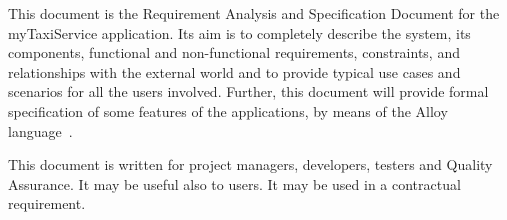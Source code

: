 This document is the  Requirement Analysis and Specification Document for the myTaxiService application.
Its aim is to completely describe the system, its components, functional and non-functional requirements, constraints, and relationships with the external world and to provide typical use cases and scenarios for all the users involved.
Further, this document will provide formal specification of some features of the applications, by means of the Alloy language~\cite{alloy-site}.

This document is written for project managers, developers, testers and Quality Assurance. It may be useful also to users. It may be used in a contractual requirement.
